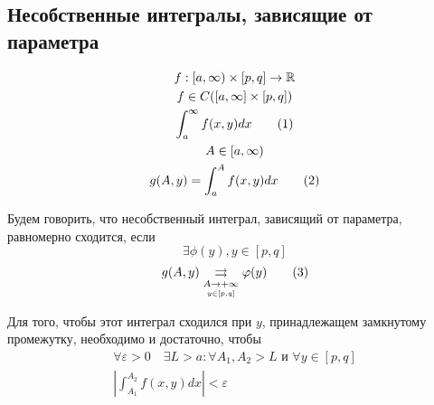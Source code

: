 \documentclass[main]{subfiles}
\begin{document}
     \subsection*{Несобственные интегралы, зависящие от параметра}
     \begin{definition}
          \begin{gather*}
               f: [a, \infty) \times [p,q] \rightarrow \mathbb{R} \\
               f \in C([a,\infty] \times [p,q]) \\
               \int^\infty_a f(x,y) dx \tag{1} \\
               A \in [a,\infty) \\
               g(A,y) = \int^A_a f(x,y) dx \tag{2}
          \end{gather*}
     \end{definition}
     \begin{definition}
          Будем говорить, что несобственный интеграл, зависящий от параметра, равномерно сходится, если
          \[ \exists \phi(y), y \in [p,q] \]
          \[ g(A,y) \underset{\underset{y \in [p,q]}{A \to + \infty}}{\rightrightarrows} \varphi(y) \tag{3} \]
     \end{definition}
     \begin{theorem}
          Для того, чтобы этот интеграл сходился при $y$, принадлежащем замкнутому промежутку, необходимо и достаточно, чтобы
          \begin{gather*}
               \forall \varepsilon > 0 \quad \exists L > a : \forall A_1, A_2 > L \text{ и } \forall y \in [p,q] \\
               \left | \int^{A_2}_{A_1}  f(x,y) dx \right | < \varepsilon \tag{4} \end{gather*}
          \end{theorem}
\end{document}
